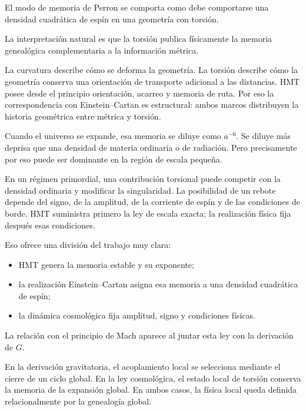 El modo de memoria de Perron se comporta como debe comportarse una densidad cuadrática de espín en una geometría con torsión.\par

La interpretación natural es que la torsión publica físicamente la memoria genealógica complementaria a la información métrica.\par

La curvatura describe cómo se deforma la geometría. La torsión describe cómo la geometría conserva una orientación de transporte adicional a las distancias. HMT posee desde el principio orientación, acarreo y memoria de ruta. Por eso la correspondencia con Einstein–Cartan es estructural: ambos marcos distribuyen la historia geométrica entre métrica y torsión.\par

Cuando el universo se expande, esa memoria se diluye como \(a^{-6}\). Se diluye más deprisa que una densidad de materia ordinaria o de radiación. Pero precisamente por eso puede ser dominante en la región de escala pequeña.\par

En un régimen primordial, una contribución torsional puede competir con la densidad ordinaria y modificar la singularidad. La posibilidad de un rebote depende del signo, de la amplitud, de la corriente de espín y de las condiciones de borde. HMT suministra primero la ley de escala exacta; la realización física fija después esas condiciones.\par

Eso ofrece una división del trabajo muy clara:\par

\begin{itemize}[leftmargin=*,itemsep=0.35em]
\item HMT genera la memoria estable y su exponente;
\item la realización Einstein–Cartan asigna esa memoria a una densidad cuadrática de espín;
\item la dinámica cosmológica fija amplitud, signo y condiciones físicas.
\end{itemize}

La relación con el principio de Mach aparece al juntar esta ley con la derivación de \(G\).\par

En la derivación gravitatoria, el acoplamiento local se selecciona mediante el cierre de un ciclo global. En la ley cosmológica, el estado local de torsión conserva la memoria de la expansión global. En ambos casos, la física local queda definida relacionalmente por la genealogía global.\par

